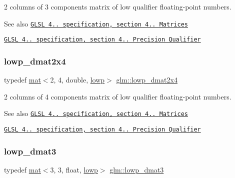 2 columns of 3 components matrix of low qualifier floating-\/point numbers.

\begin{DoxySeeAlso}{See also}
\href{http://www.opengl.org/registry/doc/GLSLangSpec.4.20.8.pdf}{\tt G\+L\+SL 4.. specification, section 4.. Matrices} 

\href{http://www.opengl.org/registry/doc/GLSLangSpec.4.20.8.pdf}{\tt G\+L\+SL 4.. specification, section 4.. Precision Qualifier} 
\end{DoxySeeAlso}
\mbox{\label{group__core__precision_ga7832375b36ade5886dd947a2a378d1ac}} 
\subsubsection{\texorpdfstring{lowp\+\_\+dmat2x4}{lowp\_dmat2x4}}
{\footnotesize\ttfamily typedef \mbox{\hyperlink{structglm_1_1mat}{mat}}$<$2, 4, double, \mbox{\hyperlink{namespaceglm_a36ed105b07c7746804d7fdc7cc90ff25ae161af3fc695e696ce3bf69f7332bc2d}{lowp}}$>$ \mbox{\hyperlink{group__core__precision_ga7832375b36ade5886dd947a2a378d1ac}{glm\+::lowp\+\_\+dmat2x4}}}

2 columns of 4 components matrix of low qualifier floating-\/point numbers.

\begin{DoxySeeAlso}{See also}
\href{http://www.opengl.org/registry/doc/GLSLangSpec.4.20.8.pdf}{\tt G\+L\+SL 4.. specification, section 4.. Matrices} 

\href{http://www.opengl.org/registry/doc/GLSLangSpec.4.20.8.pdf}{\tt G\+L\+SL 4.. specification, section 4.. Precision Qualifier} 
\end{DoxySeeAlso}
\mbox{\label{group__core__precision_ga2e700c380867b8d935f2c9ea40c9ca16}} 
\subsubsection{\texorpdfstring{lowp\+\_\+dmat3}{lowp\_dmat3}}
{\footnotesize\ttfamily typedef \mbox{\hyperlink{structglm_1_1mat}{mat}}$<$3, 3, float, \mbox{\hyperlink{namespaceglm_a36ed105b07c7746804d7fdc7cc90ff25ae161af3fc695e696ce3bf69f7332bc2d}{lowp}}$>$ \mbox{\hyperlink{group__core__precision_ga2e700c380867b8d935f2c9ea40c9ca16}{glm\+::lowp\+\_\+dmat3}}}

